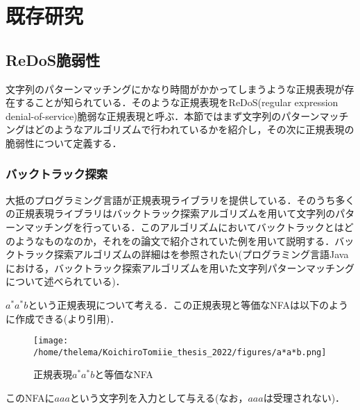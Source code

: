 \documentclass[a4paper, 12pt, dvipdfmx, uplatex]{jsreport}
\begin{document}
\chapter{既存研究}


\section{ReDoS脆弱性}
文字列のパターンマッチングにかなり時間がかかってしまうような正規表現が存在することが知られている．そのような正規表現をReDoS(regular expression denial-of-service)脆弱な正規表現と呼ぶ．本節ではまず文字列のパターンマッチングはどのようなアルゴリズムで行われているかを紹介し，その次に正規表現の脆弱性について定義する．

\subsection{バックトラック探索}
大抵のプログラミング言語が正規表現ライブラリを提供している．そのうち多くの正規表現ライブラリはバックトラック探索アルゴリズムを用いて文字列のパターンマッチングを行っている．このアルゴリズムにおいてバックトラックとはどのようなものなのか，それを\cite{javascript}の論文で紹介されていた例を用いて説明する．バックトラック探索アルゴリズムの詳細は\cite{java}を参照されたい(プログラミング言語Javaにおける，バックトラック探索アルゴリズムを用いた文字列パターンマッチングについて述べられている)．

$a^*a^*b$という正規表現について考える．この正規表現と等価なNFAは以下のように作成できる(\cite{javascript}より引用)．

\begin{figure}[H] %
  \centering
  \texttt{[image: /home/thelema/KoichiroTomiie\_thesis\_2022/figures/a*a*b.png]}
  \caption{正規表現$a^*a^*b$と等価なNFA\label{ラベル名}}
\end{figure}


このNFAに$aaa$という文字列を入力として与える(なお，$aaa$は受理されない)．
\end{document}
